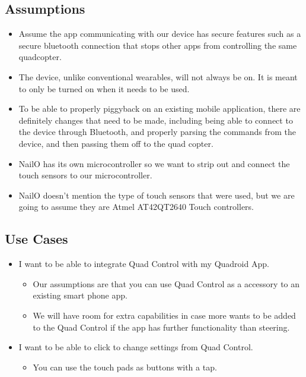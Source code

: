 \documentclass[12pt,letterpaper]{article}
\begin{document}
\subsection*{Assumptions}
\begin{itemize}
\item Assume the app communicating with our device has secure features such as a secure bluetooth connection that stops other apps from controlling the same quadcopter. 
\item The device, unlike conventional wearables, will not always be on. It is meant to only be turned on when it needs to be used. 
\item To be able to properly piggyback on an existing mobile application, there are definitely changes that need to be made, including being able to connect to the device through Bluetooth, and properly parsing the commands from the device, and then passing them off to the quad copter.
\item NailO has its own microcontroller so we want to strip out and connect the touch sensors to our microcontroller.
\item NailO doesn't mention the type of touch sensors that were used, but we are going to assume they are Atmel AT42QT2640 Touch controllers.
\end{itemize}

\subsection*{Use Cases}
\begin{itemize}
\item I want to be able to integrate Quad Control with my Quadroid App.
	\begin{itemize}
		\item Our assumptions are that you can use Quad Control as a accessory to an existing smart phone app.
		\item We will have room for extra capabilities in case more wants to be added to the Quad Control if the app has further functionality than steering.
	\end{itemize}
\item I want to be able to click to change settings from Quad Control.
	\begin{itemize}
		\item You can use the touch pads as buttons with a tap.
	\end{itemize}
\end{itemize}
\end{document}

